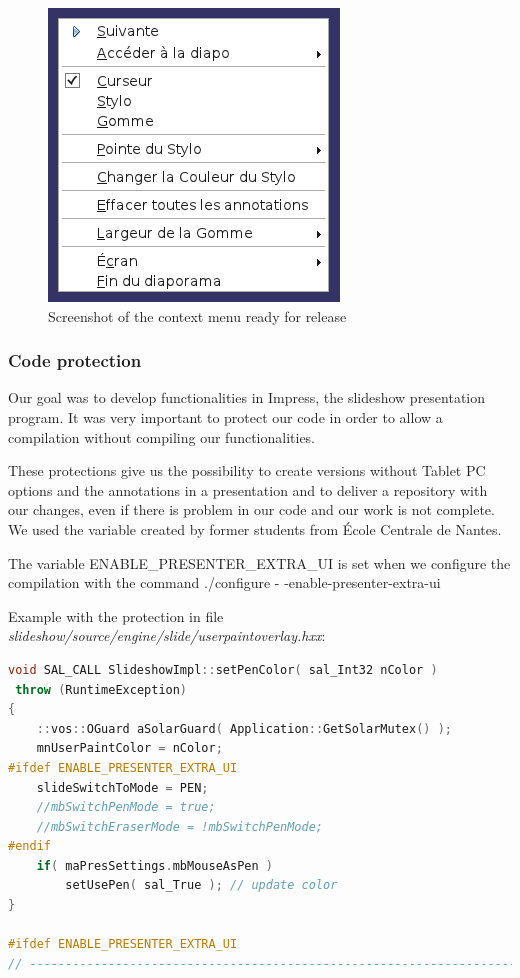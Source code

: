 \documentclass[a4paper,11pt]{article}
\begin{document}
\begin{figure}[!h]
\centering
\includegraphics[scale=0.5]{images/Context_menu.png}
\caption{Screenshot of the context menu ready for release}
\end{figure}

\subsubsection*{Code protection}

Our goal was to develop functionalities in Impress, the slideshow presentation
program. It was very important to protect our code in order to allow a
compilation without compiling our functionalities.

These protections give us the possibility to create versions without Tablet PC
options and the annotations in a presentation and to deliver a repository with
our changes, even if there is problem in our code and our work is not
complete. We used the variable created by former students from École Centrale
de Nantes.

The variable ENABLE\_PRESENTER\_EXTRA\_UI is set when we configure the
compilation with the command ./configure - -enable-presenter-extra-ui

Example with the protection in file
\emph{slideshow/source/engine/slide/userpaintoverlay.hxx}:

\begin{lstlisting}[language=C++]
void SAL_CALL SlideshowImpl::setPenColor( sal_Int32 nColor )
 throw (RuntimeException)
{
	::vos::OGuard aSolarGuard( Application::GetSolarMutex() );
	mnUserPaintColor = nColor;
#ifdef ENABLE_PRESENTER_EXTRA_UI
    slideSwitchToMode = PEN;
	//mbSwitchPenMode = true;
	//mbSwitchEraserMode = !mbSwitchPenMode;
#endif
	if( maPresSettings.mbMouseAsPen )
		setUsePen( sal_True ); // update color
}

#ifdef ENABLE_PRESENTER_EXTRA_UI
// --------------------------------------------------------------------
\end{lstlisting}
\end{document}
